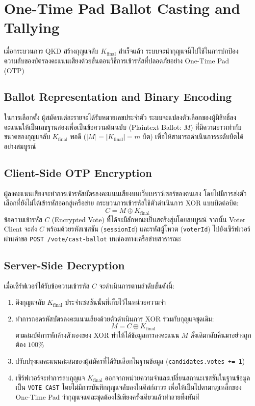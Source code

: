 \section{One-Time Pad Ballot Casting and Tallying}
เมื่อกระบวนการ QKD สร้างกุญแจลับ $K_{\text{final}}$ สำเร็จแล้ว ระบบจะนำกุญแจนี้ไปใช้ในการปกป้องความลับของบัตรลงคะแนนเสียงด้วยขั้นตอนวิธีการเข้ารหัสที่ปลอดภัยอย่าง One-Time Pad (OTP)~\cite{vernam_cipher, shannon_secure}

\subsection{Ballot Representation and Binary Encoding}
ในการเลือกตั้ง ผู้สมัครแต่ละรายจะได้รับหมายเลขประจำตัว ระบบจะแปลงตัวเลือกของผู้มีสิทธิ์ลงคะแนนให้เป็นเลขฐานสองเพื่อเป็นข้อความต้นฉบับ (Plaintext Ballot: $M$) ที่มีความยาวเท่ากับขนาดของกุญแจลับ $K_{\text{final}}$ พอดี ($|M| = |K_{\text{final}}| = m$ บิต) เพื่อให้สามารถดำเนินการระดับบิตได้อย่างสมบูรณ์

\subsection{Client-Side OTP Encryption}
ผู้ลงคะแนนเสียงจะทำการเข้ารหัสบัตรลงคะแนนเสียงบนเว็บเบราว์เซอร์ของตนเอง โดยไม่มีการส่งตัวเลือกที่ยังไม่ได้เข้ารหัสออกสู่เครือข่าย กระบวนการเข้ารหัสใช้ตัวดำเนินการ XOR แบบบิตต่อบิต:
\begin{equation}
    C = M \oplus K_{\text{final}}
\end{equation}
ข้อความเข้ารหัส $C$ (Encrypted Vote) ที่ได้จะมีลักษณะเป็นสตริงสุ่มโดยสมบูรณ์ จากนั้น Voter Client จะส่ง $C$ พร้อมด้วยรหัสเซสชัน (\texttt{sessionId}) และรหัสผู้โหวต (\texttt{voterId}) ไปยังเซิร์ฟเวอร์ผ่านคำขอ \texttt{POST /vote/cast-ballot} บนช่องทางเครือข่ายสาธารณะ

\subsection{Server-Side Decryption}
เมื่อเซิร์ฟเวอร์ได้รับข้อความเข้ารหัส $C$ จะดำเนินการตามลำดับขั้นดังนี้:
\begin{enumerate}
    \item ดึงกุญแจลับ $K_{\text{final}}$ ประจำเซสชันนั้นที่เก็บไว้ในหน่วยความจำ
    \item ทำการถอดรหัสบัตรลงคะแนนเสียงด้วยตัวดำเนินการ XOR ร่วมกับกุญแจชุดเดิม:
    \begin{equation}
        M = C \oplus K_{\text{final}}
    \end{equation}
    ตามสมบัติการหักล้างตัวเองของ XOR ทำให้ได้ข้อมูลการลงคะแนน $M$ ดั้งเดิมกลับคืนมาอย่างถูกต้อง $100\%$
    \item ปรับปรุงผลคะแนนสะสมของผู้สมัครที่ได้รับเลือกในฐานข้อมูล (\texttt{candidates.votes += 1})
    \item เซิร์ฟเวอร์จะทำการลบกุญแจ $K_{\text{final}}$ ออกจากหน่วยความจำและเปลี่ยนสถานะเซสชันในฐานข้อมูลเป็น \texttt{VOTE\_CAST} โดยไม่มีการบันทึกกุญแจลับลงในดิสก์ถาวร เพื่อให้เป็นไปตามกฎเหล็กของ One-Time Pad ว่ากุญแจแต่ละชุดต้องใช้เพียงครั้งเดียวแล้วทำลายทิ้งทันที
\end{enumerate}

